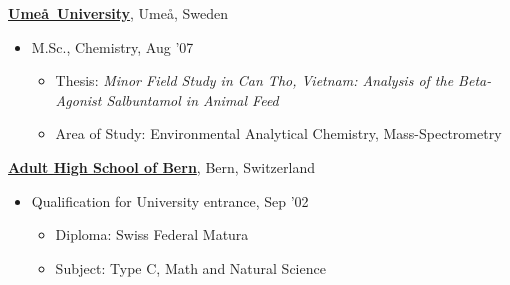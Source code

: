 \documentclass[10pt]{article}
\newenvironment{outerlist}[1][\enskip\textbullet]%
                                              {\begin{itemize}[#1,leftmargin=*]}{\end{itemize}%
                                                \vspace{-.6\baselineskip}}
\newenvironment{innerlist}[1][\enskip\textbullet]%
                                                                            {\begin{itemize}[#1,leftmargin=*,parsep=0pt,itemsep=0pt,topsep=0pt,partopsep=0pt]}
                                                                            {\end{itemize}}
\newcommand{\blankline}{\quad\pagebreak[3]}
\begin{document}
                                                                                           \href{http://www.umu.se/}{\textbf{Ume\aa\ University}},
                                                                                           Ume\aa, Sweden

                                                                                           \begin{outerlist}

                                                                                           \item[] M.Sc., Chemistry, Aug '07
                                                                                             \begin{innerlist}
                                                                                             \item Thesis: \emph{Minor Field Study in Can Tho, Vietnam: Analysis of the Beta-Agonist Salbuntamol in Animal Feed}
                                                                                             \item Area of Study: Environmental Analytical Chemistry, Mass-Spectrometry
                                                                                             \end{innerlist}
                                                                                           \end{outerlist}

                                                                                           \blankline

                                                                                           \href{http://www.bme-bern.ch}{\textbf{Adult High School of Bern}}, Bern, Switzerland

                                                                                           \begin{outerlist}

                                                                                           \item[] Qualification for University entrance, Sep '02
                                                                                             \begin{innerlist}
                                                                                             \item Diploma: Swiss Federal Matura
                                                                                             \item Subject: Type C, Math and Natural Science
                                                                                             \end{innerlist}
                                                                                           \end{outerlist}
\end{document}
